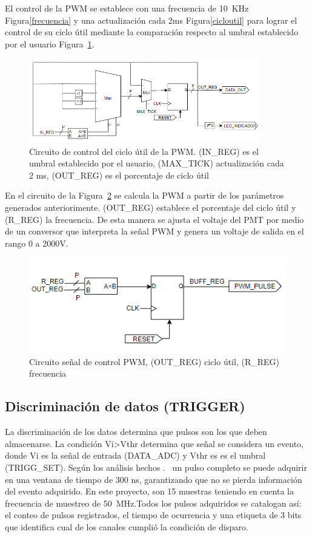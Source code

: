 El control de la PWM se establece con una frecuencia de 10~KHz Figura\ref{frecuencia} y una actualización cada 2ms Figura\ref{cicloutil} para lograr el control de su ciclo útil mediante la comparación respecto al umbral establecido por el usuario Figura~\ref{pwm}.
\begin{figure}[h]
\includegraphics[width=0.9\textwidth]{Figs/RAMPA33.PNG} 
\centering
\caption[Circuito de control del ciclo útil de la PWM]{Circuito de control del ciclo útil de la PWM. (IN\_REG) es el umbral establecido por el usuario, (MAX\_TICK) actualización cada 2 ms, (OUT\_REG) es el porcentaje de ciclo útil}
\label{pwm}
\end{figure}

En el circuito de la Figura~\ref{salida} se calcula la PWM a partir de los parámetros generados anteriorimente.
(OUT\_REG) establece el porcentaje del ciclo útil y (R\_REG) la frecuencia.
De esta manera se ajusta el voltaje del PMT por medio de un conversor que interpreta la señal PWM y genera un voltaje de salida en el rango 0 a 2000V.

\begin{figure}[h]
\includegraphics[scale=1]{Figs/RAMPA22.PNG} 
\centering
\caption{Circuito señal de control PWM, (OUT\_REG) ciclo útil, (R\_REG) frecuencia}
\label{salida}
\end{figure}


\subsection{Discriminación de datos (TRIGGER)}

La discriminación de los datos determina que pulsos son los que deben almacenarse. La condición Vi\textgreater Vthr determina que señal se considera un evento, donde Vi es la señal de entrada (DATA\_ADC) y Vthr es es el umbral (TRIGG\_SET). Según los análisis hechos .~\citep{haro2016data} un pulso completo se puede adquirir en una ventana de tiempo de 300 ns, garantizando que no se pierda información del evento adquirido. En este proyecto, son 15 muestras teniendo en cuenta la frecuencia de muestreo de 50~MHz.Todos los pulsos adquiridos se catalogan así: el conteo de pulsos registrados, el tiempo de ocurrencia y una etiqueta de 3 bits que identifica cual de los canales cumplió la condición de disparo.


